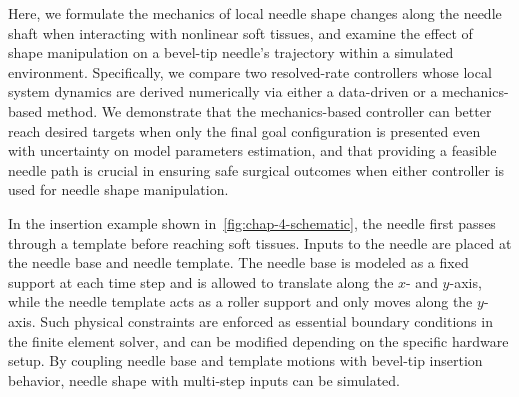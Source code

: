 Here, we formulate the mechanics of local needle shape changes along the needle shaft when interacting with nonlinear soft tissues, and examine the effect of shape manipulation on a bevel-tip needle's trajectory within a simulated environment. Specifically, we compare two resolved-rate controllers whose local system dynamics are derived numerically via either a data-driven or a mechanics-based method. We demonstrate that the mechanics-based controller can better reach desired targets when only the final goal configuration is presented even with uncertainty on model parameters estimation, and that providing a feasible needle path is crucial in ensuring safe surgical outcomes when either controller is used for needle shape manipulation.

In the insertion example shown in~\cref{fig:chap-4-schematic}, the needle first passes through a template before reaching soft tissues. Inputs to the needle are placed at the needle base and needle template. The needle base is modeled as a fixed support at each time step and is allowed to translate along the $x$- and $y$-axis, while the needle template acts as a roller support and only moves along the $y$-axis. Such physical constraints are enforced as essential boundary conditions in the finite element solver, and can be modified depending on the specific hardware setup. By coupling needle base and template motions with bevel-tip insertion behavior, needle shape with multi-step inputs can be simulated.

